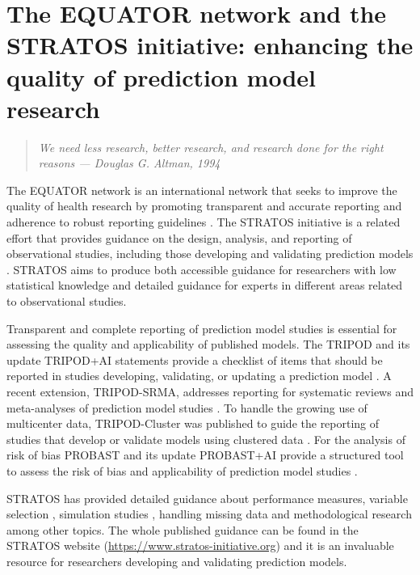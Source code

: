 \section[Enhancing quality of prediction model research]{The EQUATOR network and the STRATOS initiative: enhancing the quality of prediction model research}
 \begin{quote}
    \textit{We need less research, better research, and research done for the right reasons --- Douglas G. Altman, 1994 \cite{altmanScandalPoorMedical1994}}
\end{quote}

The \gls{EQUATOR} network is an international network that seeks to improve the quality of health research by promoting transparent and accurate reporting and adherence to robust reporting guidelines \cite{simeraTransparentAccurateReporting2010}. The \gls{STRATOS} initiative is a related effort that provides guidance on the design, analysis, and reporting of observational studies, including those developing and validating prediction models \cite{sauerbreiSTRengtheningAnalyticalThinking2014}. \gls{STRATOS} aims to produce both accessible guidance for researchers with low statistical knowledge and detailed guidance for experts in different areas related to observational studies.

Transparent and complete reporting of prediction model studies is essential for assessing the quality and applicability of published models. The \gls{TRIPOD} and its update \gls{TRIPOD}+AI statements provide a checklist of items that should be reported in studies developing, validating, or updating a prediction model \cite{collinsTransparentReportingMultivariable2015,collinsTRIPODAIStatementUpdated2024}. A recent extension, \gls{TRIPOD}-SRMA, addresses reporting for systematic reviews and meta-analyses of prediction model studies \cite{snellTransparentReportingMultivariable2023}. To handle the growing use of multicenter data, \gls{TRIPOD}-Cluster was published to guide the reporting of studies that develop or validate models using clustered data \cite{debrayTransparentReportingMultivariable2023}. For the analysis of risk of bias \gls{PROBAST} and its update PROBAST+AI provide a structured tool to assess the risk of bias and applicability of prediction model studies \cite{moonsPROBASTToolAssess2019, moonsPROBASTAIUpdatedQuality2025}.

\gls{STRATOS} has provided detailed guidance about performance measures, \cite{vancalsterPerformanceEvaluationPredictive2024} variable selection \cite{heinzeVariableSelectionReview2018},  simulation studies \cite{boulesteixIntroductionStatisticalSimulations2020}, handling missing data \cite{leeFrameworkTreatmentReporting2021} and methodological research \cite{heinzePhasesMethodologicalResearch2024} among other topics. The whole published guidance can be found in the STRATOS website (\url{https://www.stratos-initiative.org}) and it is an invaluable resource for researchers developing and validating prediction models. 

